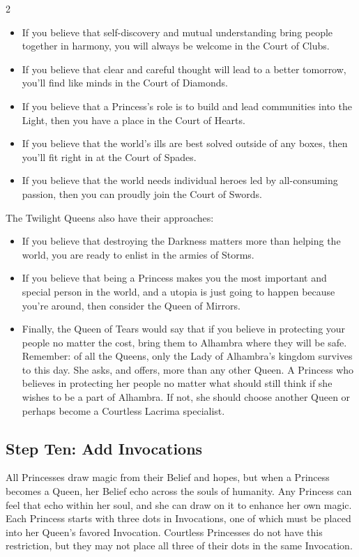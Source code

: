 \begin{multicols}{2}
\begin{itemize}
\item If you believe that self-discovery and mutual understanding bring people together in harmony, you will always be welcome in the Court of Clubs.
\item If you believe that clear and careful thought will lead to a better tomorrow, you'll find like minds in the Court of Diamonds.
\item If you believe that a Princess's role is to build and lead communities into the Light, then you have a place in the Court of Hearts.
\item If you believe that the world's ills are best solved outside of any boxes, then you'll fit right in at the Court of Spades.
\item If you believe that the world needs individual heroes led by all-consuming passion, then you can proudly join the Court of Swords. \\
\end{itemize}

The Twilight Queens also have their approaches:

\begin{itemize}
\item If you believe that destroying the Darkness matters more than helping the world, you are ready to enlist in the armies of Storms.
\item If you believe that being a Princess makes you the most important and special person in the world, and a utopia is just going to happen because you're around, then consider the Queen of Mirrors.
\item Finally, the Queen of Tears would say that if you believe in protecting your people no matter the cost, bring them to Alhambra where they will be safe. Remember: of all the Queens, only the Lady of Alhambra's kingdom survives to this day. She asks, and offers, more than any other Queen. A Princess who believes in protecting her people no matter what should still think if she wishes to be a part of Alhambra. If not, she should choose another Queen or perhaps become a Courtless Lacrima specialist. 
\end{itemize}

\bigsidebarendw

\subsection*{Step Ten: Add Invocations} 

All Princesses draw magic from their Belief and hopes, but when a Princess becomes a Queen, her Belief echo across the souls of humanity. Any Princess can feel that echo within her soul, and she can draw on it to enhance her own magic. Each Princess starts with three dots in Invocations, one of which must be placed into her Queen's favored Invocation. Courtless Princesses do not have this restriction, but they may not place all three of their dots in the same Invocation. 


\end{multicols}
